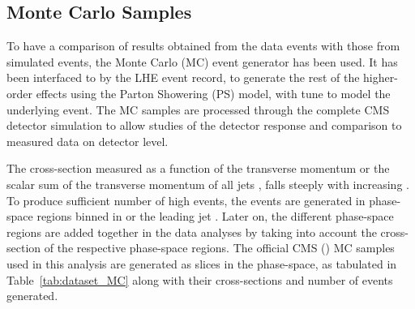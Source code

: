 \subsection{Monte Carlo Samples}
To have a comparison of results obtained from the data events with those from simulated events, the \MadGraphF Monte Carlo (MC) event generator has been used. It has been interfaced to \PYTHIAS by the LHE event record, to generate the rest of the higher-order effects using the Parton Showering (PS) model, with tune \Ztwostar to model the underlying event. The MC samples are processed through the complete CMS detector simulation to allow studies of the detector response and comparison to measured data on detector level.

The cross-section measured as a function of the transverse momentum \pt or the scalar sum of the transverse momentum of all jets \HT, falls steeply with increasing \pt. To produce sufficient number of high \pt events, the events are generated in phase-space regions binned in \HT or the leading jet \pt. Later on, the different phase-space regions are added together in the data analyses by taking into account the cross-section of the respective phase-space regions. The official CMS \MadGraphFn\plusn \PYTHIAS (\MGP) MC samples used in this analysis are generated as slices in the \HT phase-space, as tabulated in Table~\ref{tab:dataset_MC} along with their cross-sections and number of events generated.
